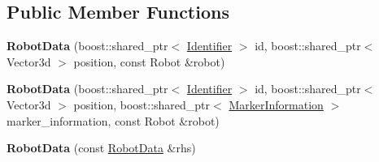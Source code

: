 \subsection*{Public Member Functions}
\begin{CompactItemize}
\item 
\hypertarget{class_robot_data_41a63a97d244ee80067af26873266d12}{
\textbf{RobotData} (boost::shared\_\-ptr$<$ \hyperlink{class_identifier}{Identifier} $>$ id, boost::shared\_\-ptr$<$ Vector3d $>$ position, const Robot \&robot)}
\label{class_robot_data_41a63a97d244ee80067af26873266d12}

\item 
\hypertarget{class_robot_data_11e1e006781a7bf7c26c93ef1ac04c21}{
\textbf{RobotData} (boost::shared\_\-ptr$<$ \hyperlink{class_identifier}{Identifier} $>$ id, boost::shared\_\-ptr$<$ Vector3d $>$ position, boost::shared\_\-ptr$<$ \hyperlink{class_marker_information}{MarkerInformation} $>$ marker\_\-information, const Robot \&robot)}
\label{class_robot_data_11e1e006781a7bf7c26c93ef1ac04c21}

\item 
\hypertarget{class_robot_data_23945633e0d7d4e732239c8f857dd2f1}{
\textbf{RobotData} (const \hyperlink{class_robot_data}{RobotData} \&rhs)}
\label{class_robot_data_23945633e0d7d4e732239c8f857dd2f1}


\end{CompactItemize}
